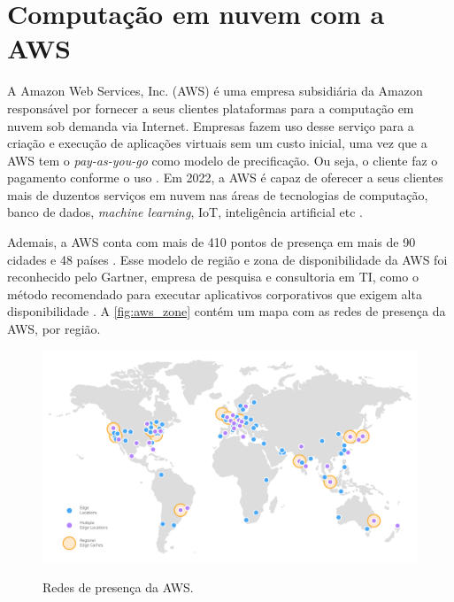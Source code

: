 \section{Computação em nuvem com a AWS}

A Amazon Web Services, Inc. (AWS) é uma empresa subsidiária da Amazon responsável por fornecer a seus clientes plataformas para a computação em nuvem sob demanda via Internet. Empresas fazem uso desse serviço para a criação e execução de aplicações virtuais sem um custo inicial, uma vez que a AWS tem o \textit{pay-as-you-go} como modelo de precificação. Ou seja, o cliente faz o pagamento conforme o uso \cite{ref:006}. Em 2022, a AWS é capaz de oferecer a seus clientes mais de duzentos serviços em nuvem nas áreas de tecnologias de computação, banco de dados, \textit{machine learning}, IoT, inteligência artificial etc \cite{ref:007}.

Ademais, a AWS conta com mais de 410 pontos de presença em mais de 90 cidades e 48 países \cite{ref:008}. Esse modelo de região e zona de disponibilidade da AWS foi reconhecido pelo Gartner, empresa de pesquisa e consultoria em TI, como o método recomendado para executar aplicativos corporativos que exigem alta disponibilidade \cite{ref:009}. A \autoref{fig:aws_zone} contém um mapa com as redes de presença da AWS, por região.

\begin{figure}[htbp]
    \centering
    \caption{Redes de presença da AWS.}
    \includegraphics[scale=0.3]{Imagens/aws_zones.png}
    \label{fig:aws_zone}
\end{figure}

